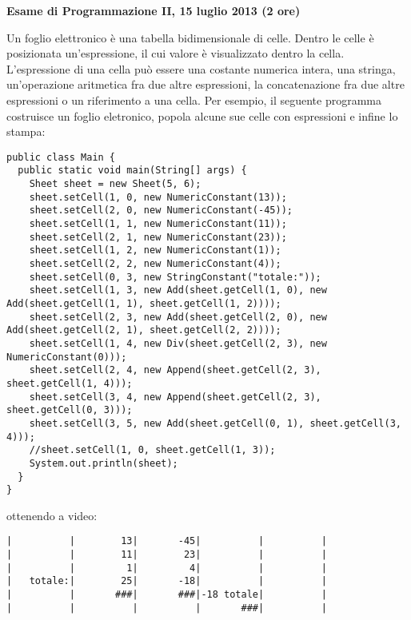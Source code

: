 \documentclass{article}[10pt]
\begin{document}
\begin{center} {\bf Esame di Programmazione II, 15 luglio 2013 (2 ore)}\end{center}

Un foglio elettronico \`e una tabella bidimensionale di celle. Dentro le celle \`e posizionata
un'espressione, il cui valore \`e visualizzato dentro la cella. L'espressione di
una cella pu\`o essere una costante numerica intera, una stringa, un'operazione aritmetica fra
due altre espressioni, la concatenazione fra due altre espressioni o un riferimento a una cella.
Per esempio, il seguente programma costruisce un foglio eletronico, popola alcune sue celle con
espressioni e infine lo stampa:

{\small
\begin{verbatim}
public class Main {
  public static void main(String[] args) {
    Sheet sheet = new Sheet(5, 6);
    sheet.setCell(1, 0, new NumericConstant(13));
    sheet.setCell(2, 0, new NumericConstant(-45));
    sheet.setCell(1, 1, new NumericConstant(11));
    sheet.setCell(2, 1, new NumericConstant(23));
    sheet.setCell(1, 2, new NumericConstant(1));
    sheet.setCell(2, 2, new NumericConstant(4));
    sheet.setCell(0, 3, new StringConstant("totale:"));
    sheet.setCell(1, 3, new Add(sheet.getCell(1, 0), new Add(sheet.getCell(1, 1), sheet.getCell(1, 2))));
    sheet.setCell(2, 3, new Add(sheet.getCell(2, 0), new Add(sheet.getCell(2, 1), sheet.getCell(2, 2))));
    sheet.setCell(1, 4, new Div(sheet.getCell(2, 3), new NumericConstant(0)));
    sheet.setCell(2, 4, new Append(sheet.getCell(2, 3), sheet.getCell(1, 4)));
    sheet.setCell(3, 4, new Append(sheet.getCell(2, 3), sheet.getCell(0, 3)));
    sheet.setCell(3, 5, new Add(sheet.getCell(0, 1), sheet.getCell(3, 4)));
    //sheet.setCell(1, 0, sheet.getCell(1, 3));
    System.out.println(sheet);
  }
}
\end{verbatim}
}

\noindent
ottenendo a video:

{\scriptsize
\begin{verbatim}
|          |        13|       -45|          |          |
|          |        11|        23|          |          |
|          |         1|         4|          |          |
|   totale:|        25|       -18|          |          |
|          |       ###|       ###|-18 totale|          |
|          |          |          |       ###|          |
\end{verbatim}
}
\end{document}
